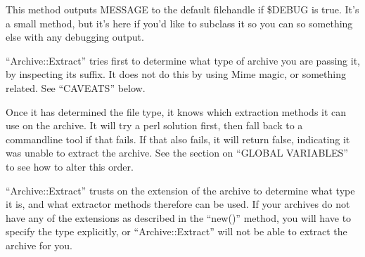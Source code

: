 \documentclass[]{article}
\begin{document}

This method outputs MESSAGE to the default filehandle if \$DEBUG is
true. It's a small method, but it's here if you'd like to subclass it so
you can so something else with any debugging output.


``Archive::Extract'' tries first to determine what type of archive you
are passing it, by inspecting its suffix. It does not do this by using
Mime magic, or something related. See ``CAVEATS'' below.

Once it has determined the file type, it knows which extraction methods
it can use on the archive. It will try a perl solution first, then fall
back to a commandline tool if that fails. If that also fails, it will
return false, indicating it was unable to extract the archive. See the
section on ``GLOBAL VARIABLES'' to see how to alter this order.



``Archive::Extract'' trusts on the extension of the archive to determine
what type it is, and what extractor methods therefore can be used. If
your archives do not have any of the extensions as described in the
``new()'' method, you will have to specify the type explicitly, or
``Archive::Extract'' will not be able to extract the archive for you.

\end{document}
